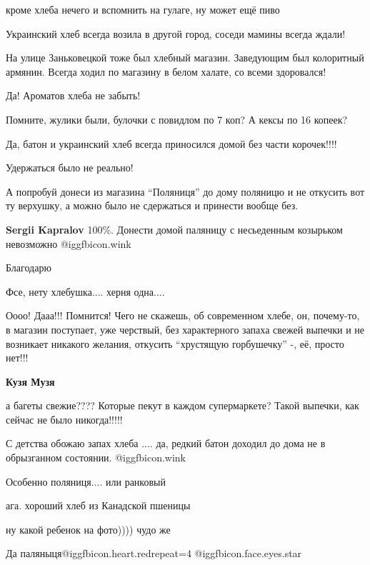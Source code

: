 \begin{itemize}
кроме хлеба нечего и вспомнить на гулаге, ну может ещё пиво

Украинский хлеб всегда возила в другой город, соседи мамины всегда ждали!


На улице Заньковецкой тоже был хлебный магазин. Заведующим был колоритный
армянин. Всегда ходил по магазину в белом халате, со всеми здоровался!

Да! Ароматов хлеба не забыть!

Помните, жулики были, булочки с повидлом по 7 коп? А кексы по 16 копеек?

Да, батон и украинский хлеб всегда приносился домой без части корочек!!!!

Удержаться было не реально!


А попробуй донеси из магазина \enquote{Поляниця} до дому поляницю и не откусить вот ту
верхушку, а можно было не сдержаться и принести вообще без.

\textbf{Sergii Kapralov}
100\%.
Донести домой паляницу с несьеденным козырьком невозможно @igg{fbicon.wink} 

Благодарю

Фсе, нету хлебушка.... херня одна....


Оооо! Дааа!!! Помнится! Чего не скажешь, об современном хлебе, он, почему-то, в
магазин поступает, уже черствый, без характерного запаха свежей выпечки и не
возникает никакого желания, откусить \enquote{хрустящую горбушечку} -, её, просто нет!!!

\textbf{Кузя Музя} 

а багеты свежие???? Которые пекут в каждом супермаркете? Такой выпечки, как
сейчас не было никогда!!!!!


С детства обожаю запах хлеба .... да, редкий батон доходил до дома не в
обрызганном состоянии.  @igg{fbicon.wink} 

Особенно поляниця.... или ранковый

ага. хороший хлеб из Канадской пшеницы

ну какой ребенок на фото)))) чудо же

Да паляныця@igg{fbicon.heart.red}{repeat=4} @igg{fbicon.face.eyes.star} 


\end{itemize}
